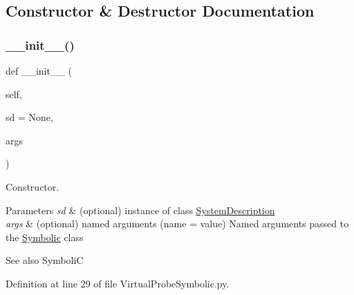 \subsection{Constructor \& Destructor Documentation}
\mbox{\label{classSignalIntegrity_1_1SystemDescriptions_1_1VirtualProbeSymbolic_1_1VirtualProbeSymbolic_a72fa31992e716f60779f561f6cdbb4ce}} 
\subsubsection{\texorpdfstring{\+\_\+\+\_\+init\+\_\+\+\_\+()}{\_\_init\_\_()}}
{\footnotesize\ttfamily def \+\_\+\+\_\+init\+\_\+\+\_\+ (\begin{DoxyParamCaption}\item[{}]{self,  }\item[{}]{sd = {\ttfamily None},  }\item[{}]{args }\end{DoxyParamCaption})}



Constructor. 


\begin{DoxyParams}{Parameters}
{\em sd} & (optional) instance of class \hyperlink{namespaceSignalIntegrity_1_1SystemDescriptions_1_1SystemDescription}{System\+Description} \\
\hline
{\em args} & (optional) named arguments (name = value) Named arguments passed to the \hyperlink{namespaceSignalIntegrity_1_1SystemDescriptions_1_1Symbolic}{Symbolic} class \\
\hline
\end{DoxyParams}
\begin{DoxySeeAlso}{See also}
SymboliC 
\end{DoxySeeAlso}


Definition at line 29 of file Virtual\+Probe\+Symbolic.\+py.



